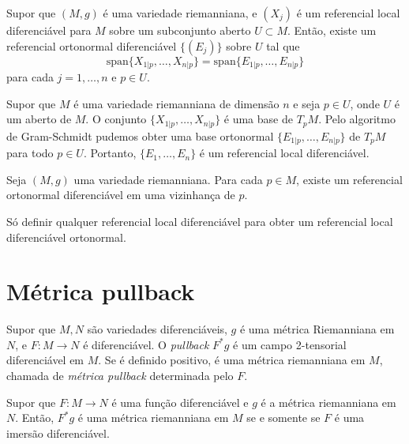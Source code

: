 \begin{proposicao}
	Supor que $(M,g)$ é uma variedade riemanniana, e $(X_j)$ é um referencial local diferenciável para $M$ sobre um subconjunto aberto $U \subset M$. Então, existe um referencial ortonormal diferenciável $\{ (E_j)\}$ sobre $U$ tal que
	\begin{equation*}
		\text{span} \{ X_{1|p}, \ldots, X_{n|p} \} = \text{span} \{ E_{1|p}, \ldots, E_{n|p} \}
	\end{equation*}
	para cada $ j=1, \ldots, n $ e $p \in U$.
\end{proposicao}

\begin{demonstracao}
	Supor que $M$ é uma variedade riemanniana de dimensão $n$ e seja $p \in U$, onde $U$ é um aberto de $M$. O conjunto $\{ X_{1|p},\ldots,X_{n|p} \}$ é uma base de $T_pM$. Pelo algoritmo de Gram-Schmidt pudemos obter uma base ortonormal $\{ E_{1|p},\ldots,E_{n|p} \}$ de $T_pM$ para todo $p \in U$. Portanto, $\{ E_1,\ldots,E_n \}$ é um referencial local diferenciável.
\end{demonstracao}

\begin{corolario}
	Seja $(M,g)$ uma variedade riemanniana. Para cada $p \in M$, existe um referencial ortonormal diferenciável em uma vizinhança de $p$.
\end{corolario}

\begin{demonstracao}
	Só definir qualquer referencial local diferenciável para obter um referencial local diferenciável ortonormal.
\end{demonstracao}

\section{Métrica pullback}

\begin{definicao}\label{metrica_pullback}
	Supor que $M,N$ são variedades diferenciáveis, $g$ é uma métrica Riemanniana em $N$, e $F: M \rightarrow N$ é diferenciável. O \emph{pullback} $F^* g$ é um campo 2-tensorial diferenciável em $M$. Se é definido positivo, é uma métrica riemanniana em $M$, chamada de \emph{métrica pullback} determinada pelo $F$.
\end{definicao}

\begin{proposicao}
	Supor que $F: M \rightarrow N$ é uma função diferenciável e $g$ é a métrica riemanniana em $N$. Então, $F^* g$ é uma métrica riemanniana em $M$ se e somente se $F$ é uma imersão diferenciável.
\end{proposicao}

